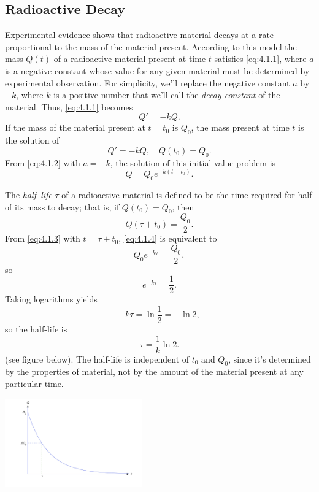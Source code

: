 \documentclass{ximera}
\begin{document}



\subsection*{Radioactive Decay}

Experimental evidence shows that radioactive material decays at a rate
proportional to the mass of the material present. According to this
model the mass $Q(t)$ of a radioactive material present at time $t$
satisfies \eqref{eq:4.1.1}, where $a$ is a negative constant whose value
for any given material must be determined by experimental observation.
For simplicity, we'll replace the negative constant $a$ by
$-k$, where
$k$ is a positive number that we'll call the \textit{decay constant}
of the material. Thus, \eqref{eq:4.1.1} becomes
$$
Q'=-kQ.
$$
If the mass of the material present
at $t=t_0$ is $Q_0$,  the mass present at time $t$ is
 the solution of
$$
Q'=-kQ,\quad  Q(t_0)=Q_0.
$$
From \eqref{eq:4.1.2}  with $a=-k$, the solution of this initial value
problem is
\begin{equation} \label{eq:4.1.3}
Q=Q_0e^{-k(t-t_0)}.
\end{equation}

The \textit{half--life} $\tau$ of a radioactive material is defined to be
the time required for half of its mass to decay; that is, if
$Q(t_0)=Q_0$, then \begin{equation} \label{eq:4.1.4} Q(\tau+t_0)=\frac{Q_0}{2}.
\end{equation}
 From \eqref{eq:4.1.3} with $t=\tau+t_0$, \eqref{eq:4.1.4} is equivalent to
$$
Q_0e^{-k\tau}=\frac{Q_0}{2},
$$
 so
$$
e^{-k\tau}=\frac{1}{2}.
$$
 Taking logarithms  yields
$$
-k\tau=\ln\frac{1}{2}=-\ln2,
$$
 so the half-life is
\begin{equation} \label{eq:4.1.5}
\tau=\frac{1}{k}\ln2.
\end{equation}
(see figure below).
The half-life is independent of $t_0$ and
$Q_0$, since it's determined by the properties of material, not by
the amount of the material present at any particular time.

\begin{image}
 \includegraphics[height=1.5in]{fig040102.jpg} 
\end{image}
\end{document}
